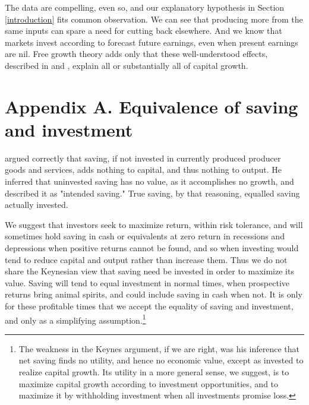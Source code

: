 \documentclass[a4padisinvitingper,fleqn]{latex_styles/cas-sc}
\begin{document}
The data are compelling, even so, and our explanatory hypothesis in Section \ref{introduction} fits common observation. We can see that producing more from the same inputs can spare a need for cutting back elsewhere. And we know that markets invest according to forecast future earnings, even when present earnings are nil. Free growth theory adds only that these well-understood effects, described in \cite{picketyCapitalIsBack2014} and \cite{kurz2023market}, explain all or substantially all of capital growth.

\appendix
\renewcommand{\theequation}{A.\arabic{equation}}
\setcounter{equation}{0}

\hypertarget{appendix-a}{
\section*{Appendix A. \hspace{0.5em}Equivalence of saving and investment}\label{appendix-a}
}

\cite{keynesGeneralTheoryEmployment1936} argued correctly that saving, if not invested in currently produced producer goods and services, adds nothing to capital, and thus nothing to output. He inferred that uninvested saving has no value, as it accomplishes no growth, and described it as "intended saving."  True saving, by that reasoning, equalled saving actually invested.

We suggest that investors seek to maximize return, within risk tolerance, and will sometimes hold saving in cash or equivalents at zero return in recessions and depressions when positive returns cannot be found, and so when investing would tend to reduce capital and output rather than increase them.
Thus we do not share the Keynesian view that saving need be invested in order to maximize its value. Saving will tend to equal investment in normal times, when prospective returns bring animal spirits, and could include saving in cash when not.
It is only for these profitable times that we accept the equality of saving and investment, and only as a simplifying assumption.\footnote{The weakness in the Keynes argument, if we are right, was his inference that net saving finds no utility, and hence no economic value, except as invested to realize capital growth. Its utility in a more general sense, we suggest, is to maximize capital growth according to investment opportunities, and to maximize it by withholding investment when all investments promise loss.}

\renewcommand{\theequation}{B.\arabic{equation}}
\setcounter{equation}{0}
\end{document}
